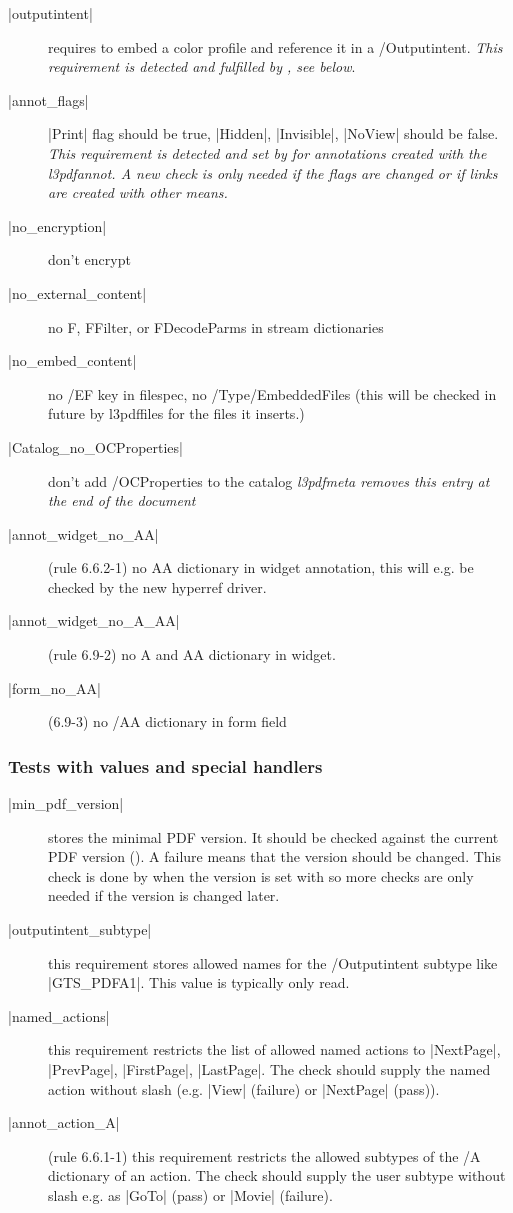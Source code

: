 \documentclass{l3doc}
\begin{document}
\begin{description}

\item[|outputintent|] requires to embed a color profile and reference it in a /Outputintent. 
 {\em This requirement is detected and fulfilled by , see below}.
 
\item[|annot_flags|] |Print| flag should be true, |Hidden|, |Invisible|, |NoView| should be false. 
 {\em This requirement is detected  and set by  for annotations created with the l3pdfannot. A new check is only needed if the flags are changed or if links are created with other means.}

\item[|no_encryption|] don't encrypt
\item[|no_external_content|] no F, FFilter, or FDecodeParms in stream dictionaries
\item[|no_embed_content|]    no /EF key in filespec, no /Type/EmbeddedFiles (this will be checked in future by l3pdffiles for the files it inserts.)
\item[|Catalog_no_OCProperties|] don't add /OCProperties to the catalog {\em l3pdfmeta removes this entry at the end of the document}
\item[|annot_widget_no_AA|] (rule 6.6.2-1)  no AA dictionary in widget annotation, this will e.g. be checked by the new hyperref driver.
\item[|annot_widget_no_A_AA|] (rule 6.9-2)  no A and AA dictionary in widget.
\item[|form_no_AA|] (6.9-3)  no /AA dictionary in form field
\end{description}

\subsubsection{Tests with values and special handlers}

\begin{description}

\item[|min_pdf_version|]  stores the minimal PDF version.  It should be checked against the current PDF version ().
 A failure means that the version should be changed.
 This check is done by  when the version is set with 
  so more checks are only needed if the version is changed later.
\item[|outputintent_subtype|] this requirement stores allowed names for the /Outputintent subtype  like |GTS_PDFA1|. 
This value is typically only read. 
\item[|named_actions|]    this requirement restricts the list of allowed named actions to |NextPage|, |PrevPage|, |FirstPage|, |LastPage|.
The check should supply the named action without slash (e.g. |View| (failure) or |NextPage| (pass)). 

\item[|annot_action_A|] (rule 6.6.1-1) this requirement restricts the allowed subtypes of the
/A dictionary of an action. The check should supply the user subtype without slash e.g. as |GoTo| (pass) or |Movie| (failure). 
\end{description}
\end{document}
